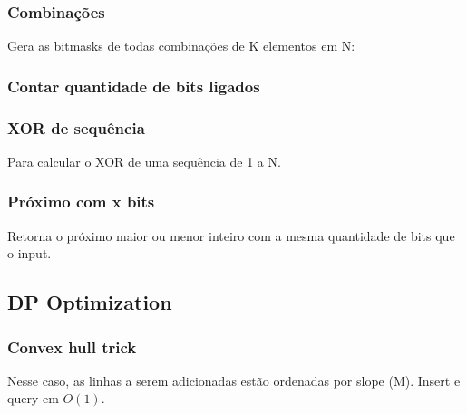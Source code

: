 \subsubsection{Combinações}
Gera as bitmasks de todas combinações de K elementos em N:

\subsubsection{Contar quantidade de bits ligados}

\subsubsection{XOR de sequ\^{e}ncia}
Para calcular o XOR de uma sequ\^{e}ncia de 1 a N.
\divisor

\subsubsection{Pr\'{o}ximo com x bits}
Retorna o pr\'{o}ximo maior ou menor inteiro com a mesma quantidade de bits que o input.

\subsection{DP Optimization}
\subsubsection{Convex hull trick}
Nesse caso, as linhas a serem adicionadas est\~{a}o ordenadas por slope (M). Insert e query em $O(1)$.

\divisor
